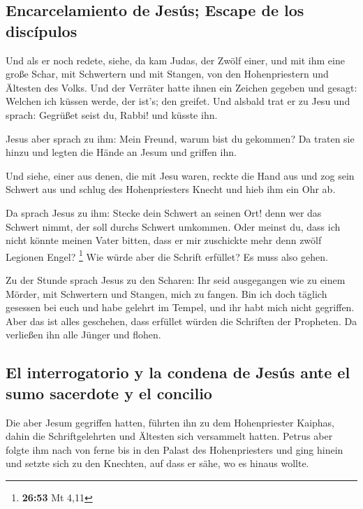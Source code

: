 \hypertarget{encarcelamiento-de-jesuxfas-escape-de-los-discuxedpulos}{%
\subsection{Encarcelamiento de Jesús; Escape de los
discípulos}\label{encarcelamiento-de-jesuxfas-escape-de-los-discuxedpulos}}

 Und als er noch redete, siehe, da kam Judas, der Zwölf
einer, und mit ihm eine große Schar, mit Schwertern und mit Stangen, von
den Hohenpriestern und Ältesten des Volks.  Und der
Verräter hatte ihnen ein Zeichen gegeben und gesagt: Welchen ich küssen
werde, der ist's; den greifet.  Und alsbald trat er zu
Jesu und sprach: Gegrüßet seist du, Rabbi! und küsste ihn.

 Jesus aber sprach zu ihm: Mein Freund, warum bist du
gekommen? Da traten sie hinzu und legten die Hände an Jesum und griffen
ihn.

 Und siehe, einer aus denen, die mit Jesu waren, reckte
die Hand aus und zog sein Schwert aus und schlug des Hohenpriesters
Knecht und hieb ihm ein Ohr ab.

 Da sprach Jesus zu ihm: Stecke dein Schwert an seinen
Ort! denn wer das Schwert nimmt, der soll durchs Schwert umkommen.
 Oder meinst du, dass ich nicht könnte meinen Vater
bitten, dass er mir zuschickte mehr denn zwölf Legionen Engel?
\footnote{\textbf{26:53} Mt 4,11}  Wie würde aber die
Schrift erfüllet? Es muss also gehen.

 Zu der Stunde sprach Jesus zu den Scharen: Ihr seid
ausgegangen wie zu einem Mörder, mit Schwertern und Stangen, mich zu
fangen. Bin ich doch täglich gesessen bei euch und habe gelehrt im
Tempel, und ihr habt mich nicht gegriffen.  Aber das ist
alles geschehen, dass erfüllet würden die Schriften der Propheten. Da
verließen ihn alle Jünger und flohen.

\hypertarget{el-interrogatorio-y-la-condena-de-jesuxfas-ante-el-sumo-sacerdote-y-el-concilio}{%
\subsection{El interrogatorio y la condena de Jesús ante el sumo
sacerdote y el
concilio}\label{el-interrogatorio-y-la-condena-de-jesuxfas-ante-el-sumo-sacerdote-y-el-concilio}}

 Die aber Jesum gegriffen hatten, führten ihn zu dem
Hohenpriester Kaiphas, dahin die Schriftgelehrten und Ältesten sich
versammelt hatten.  Petrus aber folgte ihm nach von ferne
bis in den Palast des Hohenpriesters und ging hinein und setzte sich zu
den Knechten, auf dass er sähe, wo es hinaus wollte.

